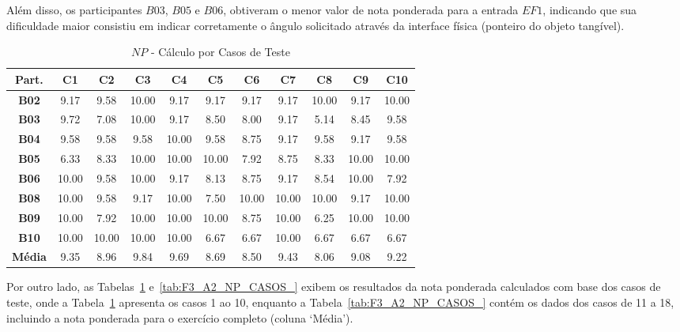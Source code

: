 Além disso, os participantes $B03$, $B05$ e $B06$, obtiveram o menor valor de nota ponderada para a entrada $EF1$, indicando que sua dificuldade maior consistiu em indicar corretamente o ângulo solicitado através da interface física (ponteiro do objeto tangível).

\begin{table}[htbp]
	\centering
	\caption{$NP$ - Cálculo por Casos de Teste}
	\begin{tabular}{|c|c|c|c|c|c|c|c|c|c|c|}
		\hline
		\rowcolor[HTML]{D9D9D9} 
		\cellcolor[HTML]{D0CECE}\textbf{Part.} & \textbf{C1} & \textbf{C2} & \textbf{C3} & \textbf{C4} & \textbf{C5} & \textbf{C6} & \textbf{C7} & \textbf{C8} & \textbf{C9} & \textbf{C10} \\ \hline
		\textbf{B02} & 9.17 & 9.58 & 10.00 & 9.17 & 9.17 & 9.17 & 9.17 & 10.00 & 9.17 & 10.00 \\ \hline
		\rowcolor[HTML]{F2F2F2} 
		\textbf{B03} & 9.72 & 7.08 & 10.00 & 9.17 & 8.50 & 8.00 & 9.17 & 5.14 & 8.45 & 9.58 \\ \hline
		\textbf{B04} & 9.58 & 9.58 & 9.58 & 10.00 & 9.58 & 8.75 & 9.17 & 9.58 & 9.17 & 9.58 \\ \hline
		\rowcolor[HTML]{F2F2F2} 
		\textbf{B05} & 6.33 & 8.33 & 10.00 & 10.00 & 10.00 & 7.92 & 8.75 & 8.33 & 10.00 & 10.00 \\ \hline
		\textbf{B06} & 10.00 & 9.58 & 10.00 & 9.17 & 8.13 & 8.75 & 9.17 & 8.54 & 10.00 & 7.92 \\ \hline
		\rowcolor[HTML]{F2F2F2} 
		\textbf{B08} & 10.00 & 9.58 & 9.17 & 10.00 & 7.50 & 10.00 & 10.00 & 10.00 & 9.17 & 10.00 \\ \hline
		\textbf{B09} & 10.00 & 7.92 & 10.00 & 10.00 & 10.00 & 8.75 & 10.00 & 6.25 & 10.00 & 10.00 \\ \hline
		\rowcolor[HTML]{F2F2F2} 
		\textbf{B10} & 10.00 & 10.00 & 10.00 & 10.00 & 6.67 & 6.67 & 10.00 & 6.67 & 6.67 & 6.67 \\ \hline
		\rowcolor[HTML]{D0CECE} 
		\textbf{Média} & 9.35 & 8.96 & 9.84 & 9.69 & 8.69 & 8.50 & 9.43 & 8.06 & 9.08 & 9.22 \\ \hline
	\end{tabular}
	\label{tab:F3_A2_NP_CASOS}
\end{table}

Por outro lado, as Tabelas~\ref{tab:F3_A2_NP_CASOS} e~\ref{tab:F3_A2_NP_CASOS_} exibem os resultados da nota ponderada calculados com base dos casos de teste, onde a Tabela~\ref{tab:F3_A2_NP_CASOS} apresenta os casos 1 ao 10, enquanto a Tabela~\ref{tab:F3_A2_NP_CASOS_} contém os dados dos casos de 11 a 18, incluindo a nota ponderada para o exercício completo (coluna `Média').

